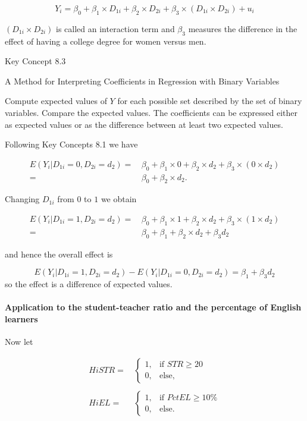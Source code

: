 \documentclass[]{book}
\let\oldparagraph\paragraph
\renewcommand{\paragraph}[1]{\oldparagraph{#1}\mbox{}}
\theoremstyle{definition}
\theoremstyle{definition}
\theoremstyle{definition}
\theoremstyle{remark}
\begin{document}
\[ Y_i = \beta_0 + \beta_1 \times D_{1i} + \beta_2 \times D_{2i} + \beta_3 \times (D_{1i} \times D_{2i}) + u_i \]

\((D_{1i} \times D_{2i})\) is called an interaction term and \(\beta_3\)
measures the difference in the effect of having a college degree for
women versus men.

Key Concept 8.3

A Method for Interpreting Coefficients in Regression with Binary
Variables

Compute expected values of \(Y\) for each possible set described by the
set of binary variables. Compare the expected values. The coefficients
can be expressed either as expected values or as the difference between
at least two expected values.

Following Key Concepts 8.1 we have

\begin{align*}
  E(Y_i\vert D_{1i}=0, D_{2i} = d_2) =& \, \beta_0 + \beta_1 \times 0 + \beta_2 \times d_2 + \beta_3 \times (0 \times d_2) \\
  =& \, \beta_0 + \beta_2 \times d_2.
\end{align*}

Changing \(D_{1i}\) from \(0\) to \(1\) we obtain

\begin{align*}
  E(Y_i\vert D_{1i}=1, D_{2i} = d_2) =& \, \beta_0 + \beta_1 \times 1 + \beta_2 \times d_2 + \beta_3 \times (1 \times d_2) \\
  =& \, \beta_0 + \beta_1 + \beta_2 \times d_2 + \beta_3 d_2
\end{align*}

and hence the overall effect is

\[ E(Y_i\vert D_{1i}=1, D_{2i} = d_2) - E(Y_i\vert D_{1i}=0, D_{2i} = d_2) = \beta_1 + \beta_3 d_2 \]
so the effect is a difference of expected values.

\paragraph{Application to the student-teacher ratio and the percentage
of English
learners}\label{application-to-the-student-teacher-ratio-and-the-percentage-of-english-learners}

Now let

\begin{align*}
  HiSTR =& \, 
    \begin{cases}
      1, & \text{if $STR \geq 20$} \\
      0, & \text{else},
    \end{cases} \\
  \\
  HiEL =& \,
    \begin{cases}
      1, & \text{if $PctEL \geq 10\%$} \\
      0, & \text{else}.
    \end{cases}
\end{align*}
\end{document}
